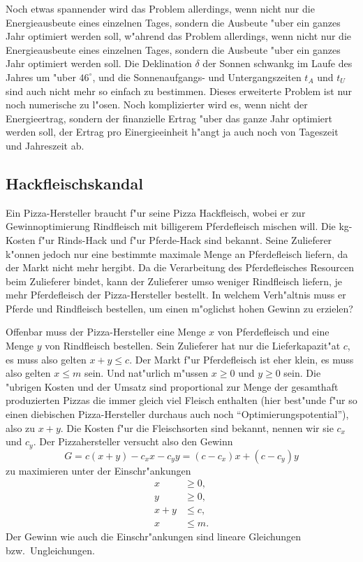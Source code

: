 Noch etwas spannender wird das Problem allerdings, wenn nicht nur
die Energieausbeute eines einzelnen Tages, sondern die Ausbeute
"uber ein ganzes Jahr optimiert werden soll, w"ahrend das Problem allerdings, wenn nicht nur
die Energieausbeute eines einzelnen Tages, sondern die Ausbeute
"uber ein ganzes Jahr optimiert werden soll. Die Deklination $\delta$
der Sonnen schwankg im Laufe des Jahres um "uber $46^\circ$, und die
Sonnenaufgangs- und Untergangszeiten $t_A$ und $t_U$ sind auch nicht mehr 
so einfach zu bestimmen. Dieses erweiterte Problem ist nur noch
numerische zu l"osen. Noch komplizierter wird es, wenn nicht der Energieertrag,
sondern der finanzielle Ertrag "uber das ganze Jahr optimiert werden soll,
der Ertrag pro Einergieeinheit h"angt ja
auch noch von Tageszeit und Jahreszeit ab.

\subsection{Hackfleischskandal\label{uebersicht:hackfleisch}}
Ein Pizza-Hersteller braucht f"ur seine Pizza Hackfleisch, wobei er
zur Gewinnoptimierung Rindfleisch mit billigerem Pferdefleisch mischen
will. Die kg-Kosten f"ur Rinds-Hack und f"ur Pferde-Hack sind bekannt.
Seine Zulieferer k"onnen jedoch nur eine bestimmte maximale Menge
an Pferdefleisch liefern, da der Markt nicht mehr hergibt.
Da die Verarbeitung des Pferdefleisches Resourcen beim Zulieferer
bindet, kann der Zulieferer umso weniger Rindfleisch liefern, je mehr
Pferdefleisch der Pizza-Hersteller bestellt. In welchem Verh"altnis
muss er Pferde und Rindfleisch bestellen, um einen m"oglichst hohen
Gewinn zu erzielen?

Offenbar muss der Pizza-Hersteller eine Menge $x$ von Pferdefleisch
und eine Menge $y$ von Rindfleisch bestellen. Sein Zulieferer hat
nur die Lieferkapazit"at $c$, es muss also gelten $x+y\le c$.
Der Markt f"ur Pferdefleisch ist eher klein, es muss also gelten
$x\le m$ sein. Und nat"urlich m"ussen $x\ge 0$ und $y\ge 0$ sein.
Die "ubrigen Kosten und der Umsatz sind proportional zur Menge
der gesamthaft produzierten Pizzas die immer gleich viel Fleisch
enthalten (hier best"unde f"ur so einen diebischen Pizza-Hersteller
durchaus auch noch ``Optimierungspotential''), also zu $x+y$. Die
Kosten f"ur die Fleischsorten sind bekannt, nennen wir sie $c_x$ und $c_y$.
Der Pizzahersteller versucht also den Gewinn
\[
G=
c(x+y)-c_xx-c_yy
=(c-c_x)x+(c-c_y)y
\]
zu maximieren unter der Einschr"ankungen
\begin{align*}
x&\ge 0,\\y&\ge 0,\\
x+y&\le c,\\
x&\le m.
\end{align*}
Der Gewinn wie auch die Einschr"ankungen sind lineare Gleichungen
bzw.~Ungleichungen.


